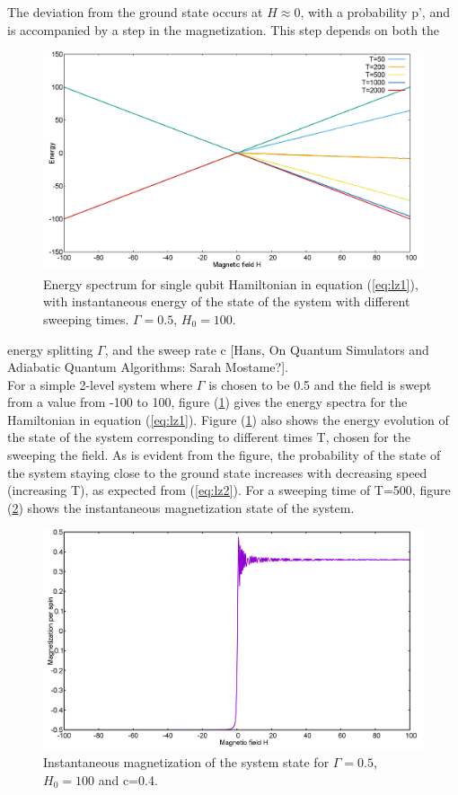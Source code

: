 \documentclass[12]{article}
\begin{document}
The deviation from the ground state occurs at $H \approx 0$, with a probability p', and is accompanied by a step in the magnetization. This step depends on both the
\begin{figure}[H]
\centering 
\includegraphics[scale=0.3]{EnergySpec_1spin_H100.png}
\caption{Energy spectrum for single qubit Hamiltonian in equation (\ref{eq:lz1}), with instantaneous energy of the state of the system with different sweeping times. $\Gamma=0.5$, $H_0=100$.}
\label{fig:lz1}
\end{figure}
 energy splitting  $\Gamma$, and the sweep rate c [Hans, On Quantum Simulators and Adiabatic Quantum Algorithms: Sarah Mostame?].\\
For a simple 2-level system where $\Gamma$ is chosen to be 0.5 and the field is swept from a value from -100 to 100, figure (\ref{fig:lz1}) gives the energy spectra for the Hamiltonian in equation (\ref{eq:lz1}).
Figure (\ref{fig:lz1}) also shows the energy evolution of the state of the system corresponding to different times T, chosen for the sweeping the field. As is evident from the figure, the probability of the state of the system staying close to the ground state increases with decreasing speed (increasing T), as expected from (\ref{eq:lz2}). For a sweeping time of T=500, figure (\ref{fig:lz2}) shows the instantaneous magnetization state of the system.
\begin{figure}[H]
\centering 
\includegraphics[scale=0.3]{Magnetization_500.png}
\caption{Instantaneous magnetization of the system state for $\Gamma=0.5$, $H_0=100$ and c=0.4.}
\label{fig:lz2}
\end{figure}
\end{document}
